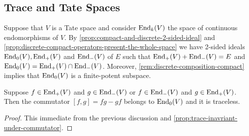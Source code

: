 \subsection{Trace and Tate Spaces}\label{Tate-and-trace}
Suppose that $V$ is a Tate space and consider $\operatorname{End}_{k}(V)$ the space of continuous endomorphisms of $V$. By \cref{prop:compact-and-discrete-2-sided-ideal} and \cref{prop:discrete-compact-operators-present-the-whole-space} we have 2-sided ideals $\operatorname{End}_{0}(V), \operatorname{End}_{+}(V)$ and $\operatorname{End}_{-}(V)$ of $E$ such that $\operatorname{End}_{+}(V) + \operatorname{End}_{-}(V) = E$ and $\operatorname{End}_{0}(V) = \operatorname{End}_{+}(V) \cap \operatorname{End}_{-}(V)$. Moreover, \cref{rem:discrete-composition-compact} implies that $\operatorname{End}_{0}(V)$ is a finite-potent subspace.
\begin{lemma}\label{lemm:traceless-commutator}
	Suppose $f \in \operatorname{End}_{+}(V)$ and $g \in \operatorname{End}_{-}(V)$ or $f \in \operatorname{End}_{-}(V)$ and $g\in \operatorname{End}_{+}(V)$. Then the commutator $[f,g] = fg - gf$ belongs to $\operatorname{End}_{0}(V)$ and it is traceless.
\end{lemma}
\begin{proof}
	This immediate from the previous discussion and \cref{prop:trace-inavriant-under-commutator}.
\end{proof}

